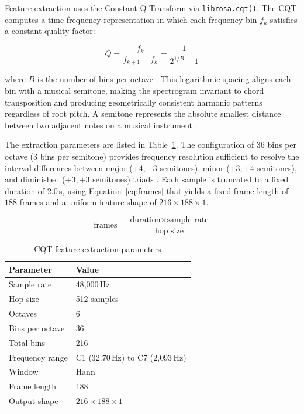 \documentclass[pdflatex,sn-mathphys-num,iicol]{sn-jnl}
\theoremstyle{thmstyleone}
\theoremstyle{thmstyletwo}
\theoremstyle{thmstylethree}
\begin{document}
Feature extraction uses the Constant-Q Transform via \texttt{librosa.cqt()}. The CQT computes a time-frequency representation in which each frequency bin $f_k$ satisfies a constant quality factor:

\begin{equation}
Q = \frac{f_k}{f_{k+1} - f_k} = \frac{1}{2^{1/B} - 1}
\label{eq:cqt}
\end{equation}

where $B$ is the number of bins per octave \cite{Li2021}\cite{Lacoste2007}. This logarithmic spacing aligns each bin with a musical semitone, making the spectrogram invariant to chord transposition and producing geometrically consistent harmonic patterns regardless of root pitch. A semitone represents the absolute smallest distance between two adjacent notes on a musical instrument \cite{Harte2010}.

The extraction parameters are listed in Table~\ref{tab:cqt-extraction-params}. The configuration of 36 bins per octave (3 bins per semitone) provides frequency resolution sufficient to resolve the interval differences between major ($+4, +3$ semitones), minor ($+3, +4$ semitones), and diminished ($+3, +3$ semitones) triads \cite{Akram2025}\cite{OHanlon2021}. Each sample is truncated to a fixed duration of 2.0\,s, using Equation~\ref{eq:frames} that yields a fixed frame length of $188$ frames and a uniform feature shape of $216 \times 188 \times 1$.

\begin{equation}
\text{frames} = \frac{\text{duration} \times \text{sample rate}}{\text{hop size}}
\label{eq:frames}
\end{equation}

\begin{table}[h]
\caption{CQT feature extraction parameters}\label{tab:cqt-extraction-params}
\begin{tabular}{@{}ll@{}}
\toprule
Parameter & Value \\
\midrule
Sample rate & 48{,}000\,Hz \\
Hop size & 512 samples \\
Octaves & 6 \\
Bins per octave & 36 \\
Total bins & 216 \\
Frequency range & C1 (32.70\,Hz) to C7 (2{,}093\,Hz) \\
Window & Hann \\
Frame length & 188 \\
Output shape & $216 \times 188 \times 1$ \\
\bottomrule
\end{tabular}
\end{table}
\end{document}
